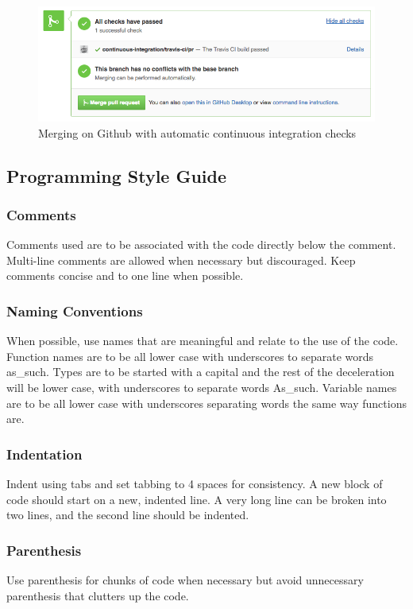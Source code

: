 \documentclass{article}
\begin{document}
\begin{figure}[h]
    \centering
    \includegraphics[width=.9\textwidth]{merge_with_travis.png}
    \caption{Merging on Github with automatic continuous integration checks }
\end{figure}



\subsection{Programming Style Guide}
\subsubsection{Comments}
Comments used are to be associated with the code directly below the comment.  Multi-line comments are allowed when necessary but discouraged.  Keep comments concise and to one line when possible.
\subsubsection{Naming Conventions}
When possible, use names that are meaningful and relate to the use of the code.  Function names are to be all lower case with underscores to separate words as\_such.  Types are to be started with a capital and the rest of the deceleration will be lower case, with underscores to separate words As\_such.  Variable names are to be all lower case with underscores separating words the same way functions are.
\subsubsection{Indentation}
Indent using tabs and set tabbing to 4 spaces for consistency.  A new block of code should start on a new, indented line.  A very long line can be broken into two lines, and the second line should be indented.
\subsubsection{Parenthesis}
Use parenthesis for chunks of code when necessary but avoid unnecessary parenthesis that clutters up the code.
\end{document}
